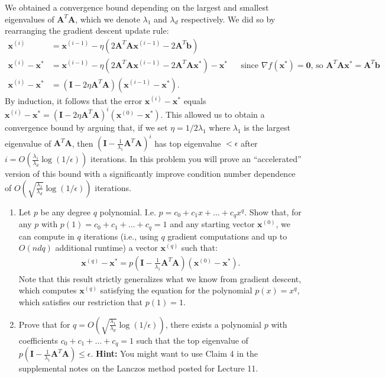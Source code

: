 \documentclass[10pt]{article}
\newcommand{\bv}[1]{\mathbf{#1}}
\begin{document}
We obtained a convergence bound depending on the largest and smallest eigenvalues of $\bv{A}^T\bv{A}$, which we denote $\lambda_1$ and $\lambda_d$ respectively. We did so by rearranging the gradient descent update rule:
\begin{align*}
	\bv{x}^{(i)} &= \bv{x}^{(i-1)} - \eta\left(2\bv{A}^T\bv{A}\bv{x}^{(i-1)} - 2\bv{A}^T\bv{b}\right) \\
	\bv{x}^{(i)} - \bv{x}^* &= \bv{x}^{(i-1)} - \eta\left(2\bv{A}^T\bv{A}\bv{x}^{(i-1)} - 2\bv{A}^T\bv{A}\bv{x}^*\right) -\bv{x}^*&& \text{since $\nabla f(\bv{x}^*)=\bv{0}$, so $\bv{A}^T\bv{A}\bv{x}^* = \bv{A}^T\bv{b}$}\\
	\bv{x}^{(i)} - \bv{x}^* &= (\bv{I} - 2\eta\bv{A}^T\bv{A})(\bv{x}^{(i-1)} - \bv{x}^*).
\end{align*}
By induction, it follows that the error $\bv{x}^{(i)} - \bv{x}^*$ equals $\bv{x}^{(i)} - \bv{x}^* = (\bv{I} - 2\eta\bv{A}^T\bv{A})^i(\bv{x}^{(0)} - \bv{x}^*)$. This allowed us to obtain a convergence bound by arguing that, if we set $\eta = 1/2\lambda_1$ where $\lambda_1$ is the largest eigenvalue of $\bv{A}^T\bv{A}$, then $(\bv{I} - \frac{1}{\lambda_1}\bv{A}^T\bv{A})^i$ has top eigenvalue $< \epsilon$ after $i = O(\frac{\lambda_1}{\lambda_d}\log(1/\epsilon))$ iterations. In this problem you will prove an ``accelerated'' version of this bound with a significantly improve condition number dependence of $O(\sqrt{\frac{\lambda_1}{\lambda_d}} \log(1/\epsilon))$ iterations.  

\begin{enumerate}
	\item Let $p$ be any degree $q$ polynomial. I.e. $p = c_0 + c_1 x + \ldots + c_q x^q$. Show that, for any $p$ with $p(1) = c_0 + c_1 + \ldots + c_q = 1$ and any starting vector $\bv{x}^{(0)}$, we can compute in $q$ iterations (i.e., using $q$ gradient computations and up to $O(ndq)$ additional runtime) a vector $\bv{x}^{(q)}$ such that:
	\begin{align*}
			\bv{x}^{(q)} - \bv{x}^* = p\left(\bv{I} - \frac{1}{\lambda_1}\bv{A}^T\bv{A}\right)(\bv{x}^{(0)} - \bv{x}^*).
		\end{align*}
	Note that this result strictly generalizes what we know from gradient descent, which computes $\bv{x}^{(q)}$ satisfying the equation for the polynomial $p(x) = x^q$, which satisfies our restriction that $p(1) = 1$. 
	\item Prove that for $q = O(\sqrt{\frac{\lambda_1}{\lambda_d}} \log(1/\epsilon))$, there exists a polynomial $p$ with coefficients $c_0 + c_1 + \ldots + c_q = 1$ such that the top eigenvalue of $p\left(\bv{I} - \frac{1}{\lambda_1}\bv{A}^T\bv{A}\right) \leq \epsilon$. \textbf{Hint:} You might want to use Claim 4 in the supplemental notes on the Lanczos method posted for Lecture 11.
\end{enumerate}
\end{document}
